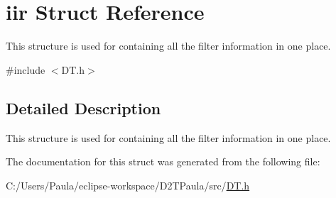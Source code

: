 \hypertarget{structiir}{}\section{iir Struct Reference}
\label{structiir}


This structure is used for containing all the filter information in one place.  




{\ttfamily \#include $<$D\+T.\+h$>$}



\subsection{Detailed Description}
This structure is used for containing all the filter information in one place. 

The documentation for this struct was generated from the following file\+:\begin{DoxyCompactItemize}
\item 
C\+:/\+Users/\+Paula/eclipse-\/workspace/\+D2\+T\+Paula/src/\mbox{\hyperlink{_d_t_8h}{D\+T.\+h}}\end{DoxyCompactItemize}
